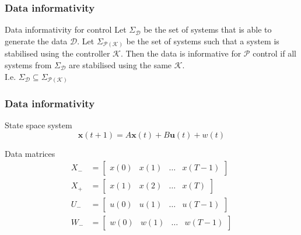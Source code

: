 \documentclass{beamer}
\begin{document}

\begin{frame}
	\frametitle{Data informativity}
	\begin{block}{Data informativity for control}
		Let $\Sigma_\mathcal{D}$ be the set of systems that is able to generate the data $\mathcal{D}$. Let $\Sigma_{\mathcal{P}(\mathcal{K})}$ be the set of systems such that a system is stabilised using the controller $\mathcal{K}$. Then the data is informative for $\mathcal{P}$ control if all systems from $\Sigma_\mathcal{D}$ are stabilised using the same $\mathcal{K}$. \\
		I.e. $\Sigma_\mathcal{D} \subseteq \Sigma_{\mathcal{P}(\mathcal{K})}$
	\end{block}
\end{frame}


\begin{frame}
	\frametitle{Data informativity}
	\begin{block}{State space system}
		\[ \mathbf{x}(t+1) = A\mathbf{x}(t) + B\mathbf{u}(t) + w(t) \]
	\end{block}

	\begin{block}{Data matrices}
		\begin{align*}
			X_- &= \begin{bmatrix} x(0) & x(1) & \dots & x(T-1) \end{bmatrix} \\
			X_+ &= \begin{bmatrix} x(1) & x(2) & \dots & x(T)   \end{bmatrix} \\
			U_- &= \begin{bmatrix} u(0) & u(1) & \dots & u(T-1) \end{bmatrix} \\
			W_- &= \begin{bmatrix} w(0) & w(1) & \dots & w(T-1) \end{bmatrix} 
		\end{align*}
	\end{block}	
\end{frame}

\end{document}
